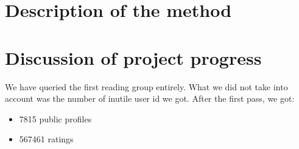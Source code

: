 \documentclass[11pt]{article}
\begin{document}
\section{Description of the method}


\section{Discussion of project progress}

We have queried the first reading group entirely.
What we did not take into account was the number of inutile user id we got.
After the first pass, we got:
\begin{itemize}
\item 7815 public profiles
\item 567461 ratings
\end{itemize}




\end{document}

